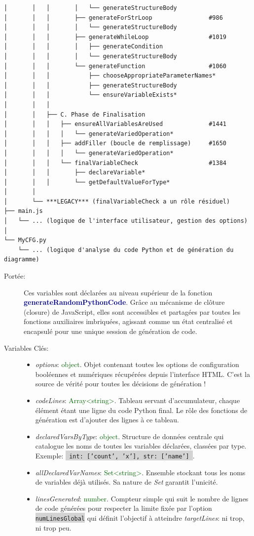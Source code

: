\documentclass[11pt,a4paper]{article}
\newcommand{\code}[1]{\colorbox{lightgray}{\texttt{\small #1}}}
\newcommand{\var}[1]{\textit{#1}}
\newcommand{\vartype}[1]{\textcolor{darkgreen}{#1}}
\newcommand{\methodname}[1]{\textbf{\textcolor{darkblue}{#1}}}
\newcommand{\param}[1]{\code{#1}}
\begin{document}
\begin{verbatim}
│       │   │       │   └── generateStructureBody
│       │   │       ├── generateForStrLoop                #986
│       │   │       │   └── generateStructureBody
│       │   │       ├── generateWhileLoop                 #1019
│       │   │       │   ├── generateCondition
│       │   │       │   └── generateStructureBody
│       │   │       └── generateFunction                  #1060
│       │   │           ├── chooseAppropriateParameterNames*
│       │   │           ├── generateStructureBody
│       │   │           └── ensureVariableExists*
│       │   │
│       │   ├── C. Phase de Finalisation
│       │   │   ├── ensureAllVariablesAreUsed             #1441
│       │   │   │   └── generateVariedOperation*
│       │   │   ├── addFiller (boucle de remplissage)     #1650
│       │   │   │   └── generateVariedOperation*
│       │   │   └── finalVariableCheck                    #1384
│       │   │       ├── declareVariable*
│       │   │       └── getDefaultValueForType*
│       │
│       └── ***LEGACY*** (finalVariableCheck a un rôle résiduel)
├── main.js
│   └── ... (logique de l'interface utilisateur, gestion des options)
│
└── MyCFG.py
    └── ... (logique d'analyse du code Python et de génération du diagramme)
\end{verbatim}

\begin{description}
\item[Portée:] Ces variables sont déclarées au niveau supérieur de la fonction \methodname{generateRandomPythonCode}. Grâce au mécanisme de clôture (closure) de JavaScript, elles sont accessibles et partagées par toutes les fonctions auxiliaires imbriquées, agissant comme un état centralisé et encapsulé pour une unique session de génération de code.
\item[Variables Clés:]
\begin{itemize}
\item \var{options}: \vartype{object}. Objet contenant toutes les options de configuration booléennes et numériques récupérées depuis l'interface HTML. C'est la source de vérité pour toutes les décisions de génération !
\item \var{codeLines}: \vartype{Array<string>}. Tableau servant d'accumulateur, chaque élément étant une ligne du code Python final. Le rôle des fonctions de génération est d'ajouter des lignes à ce tableau.
\item \var{declaredVarsByType}: \vartype{object}. Structure de données centrale qui catalogue les noms de toutes les variables déclarées, classées par type. Exemple: \code{{ int: ['count', 'x'], str: ['name'] }}.
\item \var{allDeclaredVarNames}: \vartype{Set<string>}. Ensemble stockant tous les noms de variables déjà utilisés. Sa nature de \textit{Set} garantit l'unicité.
\item \var{linesGenerated}: \vartype{number}. Compteur simple qui suit le nombre de lignes de code générées pour respecter la limite fixée par l'option \param{numLinesGlobal} qui définit l'objectif à atteindre \var{targetLines}: ni trop, ni trop peu.
\end{itemize}
\end{description}
\end{document}
